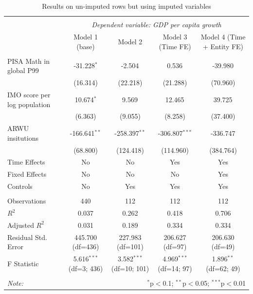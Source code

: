 \documentclass[11pt]{article}
\begin{document}
\begin{table}[!htbp] \centering
    \caption{Results on un-imputed rows but using imputed variables}
    \label{table:reg-impute}
    \resizebox{\linewidth}{!} {
    \begin{tabular}{@{\extracolsep{5pt}}lcccc}
    \\[-1.8ex]\hline
    \hline \\[-1.8ex]
    & \multicolumn{4}{c}{\textit{Dependent variable: GDP per capita growth}} \
    \cr \cline{2-5}
    \\[-1.8ex] & \multicolumn{1}{c}{Model 1 (base)} & \multicolumn{1}{c}{Model 2} & \multicolumn{1}{c}{Model 3 (Time FE)} & \multicolumn{1}{c}{Model 4 (Time + Entity FE)}  \\
    \hline \\[-1.8ex]
     PISA Math in global P99 & -31.228$^{*}$ & -2.504$^{}$ & 0.536$^{}$ & -39.980$^{}$ \\
    & (16.314) & (22.218) & (21.288) & (70.960) \\
     IMO score per log population & 10.674$^{*}$ & 9.569$^{}$ & 12.465$^{}$ & 39.725$^{}$ \\
    & (6.363) & (9.055) & (8.258) & (37.400) \\
     ARWU insitutions & -166.641$^{**}$ & -258.397$^{**}$ & -306.807$^{***}$ & -336.747$^{}$ \\
    & (68.800) & (124.418) & (114.960) & (384.764) \\
     Time Effects & No & No & Yes & Yes \\
     Fixed Effects & No & No & No & Yes \\
     Controls & No & Yes & Yes & Yes \\
    \hline \\[-1.8ex]
     Observations & 440 & 112 & 112 & 112 \\
     $R^2$ & 0.037 & 0.262 & 0.418 & 0.706 \\
     Adjusted $R^2$ & 0.031 & 0.189 & 0.334 & 0.334 \\
     Residual Std. Error & 445.700 (df=436) & 227.983 (df=101) & 206.627 (df=97) & 206.630 (df=49) \\
     F Statistic & 5.616$^{***}$ (df=3; 436) & 3.582$^{***}$ (df=10; 101) & 4.969$^{***}$ (df=14; 97) & 1.896$^{**}$ (df=62; 49) \\
    \hline
    \hline \\[-1.8ex]
    \textit{Note:} & \multicolumn{4}{r}{$^{*}$p$<$0.1; $^{**}$p$<$0.05; $^{***}$p$<$0.01} \\
    \end{tabular}
    }
    \end{table}
\end{document}
